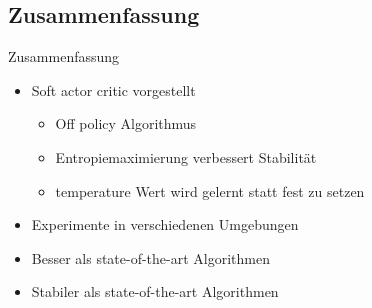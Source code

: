 \subsection{Zusammenfassung}
\begin{frame}{Zusammenfassung}
        \begin{itemize}
            \item Soft actor critic vorgestellt
            \begin{itemize}
                \item Off policy Algorithmus
                \item Entropiemaximierung verbessert Stabilität
                \item temperature Wert wird gelernt statt fest zu setzen
            \end{itemize}
                \item Experimente in verschiedenen Umgebungen
                \item Besser als state-of-the-art Algorithmen  
                \item Stabiler als state-of-the-art Algorithmen  
        \end{itemize}
\end{frame}

